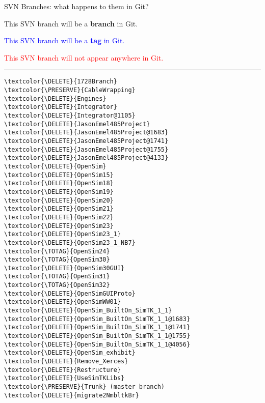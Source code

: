 \documentclass[pdf, 8pt]{beamer}
\def\DELETE{red}
\def\PRESERVE{green!60!black}
\def\TOTAG{blue}
\begin{document}
\begin{frame}[fragile]{SVN Branches: what happens to them in Git?}

\textcolor{\PRESERVE}{This SVN branch will be a \textbf{branch} in Git.}

\textcolor{\TOTAG}{This SVN branch will be a \textbf{tag} in Git.}

\textcolor{\DELETE}{This SVN branch will not appear anywhere in Git.}

\hrule
\begin{multicols}{2}
\begin{Verbatim}
\textcolor{\DELETE}{1728Branch}
\textcolor{\PRESERVE}{CableWrapping}
\textcolor{\DELETE}{Engines}
\textcolor{\DELETE}{Integrator}
\textcolor{\DELETE}{Integrator@1105}
\textcolor{\DELETE}{JasonEmel485Project}
\textcolor{\DELETE}{JasonEmel485Project@1683}
\textcolor{\DELETE}{JasonEmel485Project@1741}
\textcolor{\DELETE}{JasonEmel485Project@1755}
\textcolor{\DELETE}{JasonEmel485Project@4133}
\textcolor{\DELETE}{OpenSim}
\textcolor{\DELETE}{OpenSim15}
\textcolor{\DELETE}{OpenSim18}
\textcolor{\DELETE}{OpenSim19}
\textcolor{\DELETE}{OpenSim20}
\textcolor{\DELETE}{OpenSim21}
\textcolor{\DELETE}{OpenSim22}
\textcolor{\DELETE}{OpenSim23}
\textcolor{\DELETE}{OpenSim23_1}
\textcolor{\DELETE}{OpenSim23_1_NB7}
\textcolor{\TOTAG}{OpenSim24}
\textcolor{\TOTAG}{OpenSim30}
\textcolor{\DELETE}{OpenSim30GUI}
\textcolor{\TOTAG}{OpenSim31}
\textcolor{\TOTAG}{OpenSim32}
\textcolor{\DELETE}{OpenSimGUIProto}
\textcolor{\DELETE}{OpenSimWW01}
\textcolor{\DELETE}{OpenSim_BuiltOn_SimTK_1_1}
\textcolor{\DELETE}{OpenSim_BuiltOn_SimTK_1_1@1683}
\textcolor{\DELETE}{OpenSim_BuiltOn_SimTK_1_1@1741}
\textcolor{\DELETE}{OpenSim_BuiltOn_SimTK_1_1@1755}
\textcolor{\DELETE}{OpenSim_BuiltOn_SimTK_1_1@4056}
\textcolor{\DELETE}{OpenSim_exhibit}
\textcolor{\DELETE}{Remove_Xerces}
\textcolor{\DELETE}{Restructure}
\textcolor{\DELETE}{UseSimTKLibs}
\textcolor{\PRESERVE}{Trunk} (master branch)
\textcolor{\DELETE}{migrate2NmbltkBr}
\end{Verbatim}
\end{multicols}
\end{frame}
\end{document}
